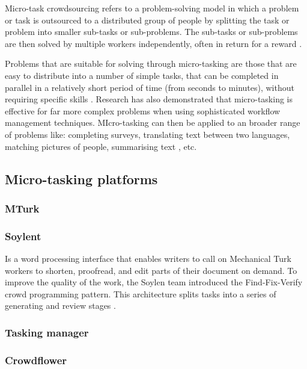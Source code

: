 Micro-task crowdsourcing refers to a problem-solving model in which a problem or task is outsourced to a distributed group of people by splitting the task or problem into smaller sub-tasks or sub-problems. The sub-tasks or sub-problems are then solved by multiple workers independently, often in return for a reward \citep{Sarasua2012}. 

Problems that are suitable for solving through micro-tasking are those that are easy to distribute into a number of simple tasks, that can be completed in parallel in a relatively short period of time (from seconds to minutes), without requiring specific skills \citep{Sarasua2012}. Research has also demonstrated that micro-tasking is effective for far more complex problems when using sophisticated workflow management techniques. MIcro-tasking can then be applied to an broader range of problems like: completing surveys, translating text between two languages, matching pictures of people, summarising text \citep{Bernstein2015a}, etc.  

\subsection{Micro-tasking platforms}

\subsubsection{MTurk}

\subsubsection{Soylent}
Is a word processing interface that enables writers to call on Mechanical Turk workers to shorten, proofread, and edit parts of their document on demand. To improve the quality of the work, the Soylen team introduced the Find-Fix-Verify crowd programming pattern. This architecture splits tasks into a series of generating and review stages \citep{Bernstein2015a}. 

\subsubsection{Tasking manager}

\subsubsection{Crowdflower}

